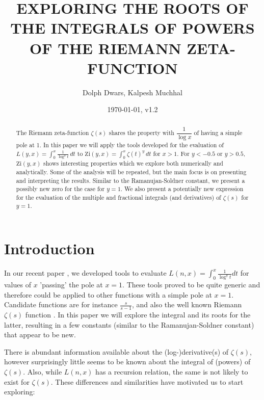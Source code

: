\documentclass[a4paper,11pt,twoside]{amsart}
\newcommand\Zi{\mathrm{Zi}}
\begin{document}
\title[Roots of integrals of powers of the Riemann Zeta-function]{EXPLORING THE ROOTS OF THE INTEGRALS OF POWERS OF THE RIEMANN ZETA-FUNCTION}

\author{Dolph Dwars, Kalpesh Muchhal}
\date{\today, v1.2}
\address{\tt{{\it E-mail Address}: ra.dwars@quicknet.nl}}
\address{\tt{{\it E-mail Address}: kalpesh.muchhal@iitbombay.org}}

\begin{abstract}
The Riemann zeta-function $\zeta(s)$ shares the property with $\dfrac{1}{\log x}$ of having a simple pole at 1. In this paper we will apply the tools developed for the evaluation of $\displaystyle L(y,x) = \int_0^x \frac{1}{\log^{y} t}\, dt$ to $\displaystyle \Zi(y,x)=\int_0^x \zeta(t)^{y}\, dt$ for $x>1$. For $y < -0.5$ or $y > 0.5$, $\Zi(y,x)$ shows interesting properties which we explore both numerically and analytically. Some of the analysis will be repeated, but the main focus is on presenting and interpreting the results. Similar to the Ramanujan-Soldner constant, we present a possibly new zero for the case for $y=1$. We also present a potentially new expression for the evaluation of the multiple and fractional integrals (and derivatives) of $\zeta(s)$ for $y=1$. 
\end{abstract}

\maketitle

\section{Introduction}

In our recent paper \cite{mudw}, we developed tools to evaluate $L(n,x) = \int_0^x \frac{1}{\log^{y} t} dt$ for values of $x$ 'passing' the pole at $x=1$. These tools proved to be quite generic and therefore could be applied to other functions with a simple pole at $x=1$. Candidate functions are for instance $\frac{s}{s-1}$, and also the well known Riemann $\zeta(s)$ function \cite{edwr}. In this paper we will explore the integral and its roots for the latter, resulting in a few constants (similar to the Ramanujan-Soldner constant) that appear to be new.

There is abundant information available about the (log-)derivative(s) of $\zeta(s)$, however surprisingly little seems to be known about the integral of (powers) of $\zeta(s)$. Also, while $L(n,x)$ has a recursion relation, the same is not likely to exist for $\zeta(s)$. These differences and similarities have motivated us to start exploring:
\end{document}
